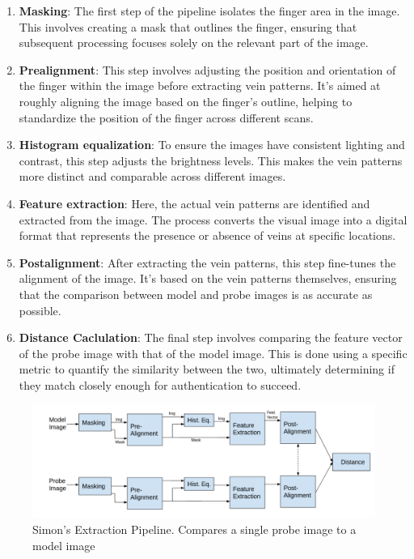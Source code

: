 \begin{enumerate}
    \item \textbf{Masking}: The first step of the pipeline isolates the finger area in the image. This involves creating a mask that outlines the finger, ensuring that subsequent processing focuses solely on the relevant part of the image.

    \item \textbf{Prealignment}: This step involves adjusting the position and orientation of the finger within the image before extracting vein patterns. It's aimed at roughly aligning the image based on the finger's outline, helping to standardize the position of the finger across different scans.

    \item \textbf{Histogram equalization}: To ensure the images have consistent lighting and contrast, this step adjusts the brightness levels. This makes the vein patterns more distinct and comparable across different images.

    \item \textbf{Feature extraction}: Here, the actual vein patterns are identified and extracted from the image. The process converts the visual image into a digital format that represents the presence or absence of veins at specific locations.

    \item \textbf{Postalignment}: After extracting the vein patterns, this step fine-tunes the alignment of the image. It's based on the vein patterns themselves, ensuring that the comparison between model and probe images is as accurate as possible.

    \item \textbf{Distance Caclulation}: The final step involves comparing the feature vector of the probe image with that of the model image. This is done using a specific metric to quantify the similarity between the two, ultimately determining if they match closely enough for authentication to succeed.
\end{enumerate} 

\begin{figure}[!h]
    \centering
    \includegraphics[width=1\linewidth]{latex-img/pipeline_simon.png}
    \caption{Simon's Extraction Pipeline. Compares a single probe image to a model image}
    \label{pipeline_simon}
\end{figure}


